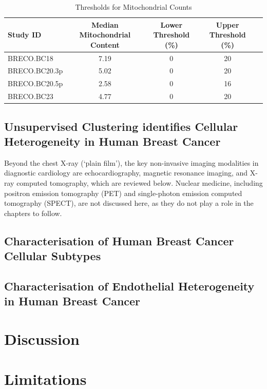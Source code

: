 \begin{table}
	\centering
	\small
	\renewcommand{\arraystretch}{1.4}
	\begin{tabular}{| l | c | c | c | c |}
		\hline
		Study ID & Median Mitochondrial Content & Lower Threshold (\%) & Upper Threshold (\%) \\
		\hline
		BRECO.BC18 		& 7.19 & 0 & 20 \\
		BRECO.BC20.3p 	& 5.02 & 0 & 20 \\
		BRECO.BC20.5p 	& 2.58 & 0 & 16 \\
		BRECO.BC23 		& 4.77 & 0 & 20 \\
		\hline
	\end{tabular}
	\caption{Thresholds for Mitochondrial Counts}
	\label{tab: qc_thesholds_mito_percent}
\end{table}




\subsection{Unsupervised Clustering identifies Cellular Heterogeneity in Human Breast Cancer}
\label{sub:diagnostic}

Beyond the chest X-ray (`plain film'), the key non-invasive imaging modalities in diagnostic cardiology are echocardiography, magnetic resonance imaging, and X-ray computed tomography, which are reviewed below.  Nuclear medicine, including positron emission tomography (PET) and single-photon emission computed tomography (SPECT), are not discussed here, as they do not play a role in the chapters to follow.

\subsection{Characterisation of Human Breast Cancer Cellular Subtypes}







\subsection{Characterisation of Endothelial Heterogeneity in Human Breast Cancer}



\section{Discussion}

\section{Limitations}
